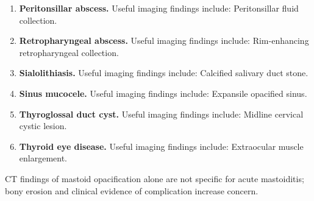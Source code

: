 \begin{enumerate}[leftmargin=*,itemsep=0.45em,topsep=0.4em]
\item \textbf{Peritonsillar abscess.} Useful imaging findings include: Peritonsillar fluid collection.
\item \textbf{Retropharyngeal abscess.} Useful imaging findings include: Rim-enhancing retropharyngeal collection.
\item \textbf{Sialolithiasis.} Useful imaging findings include: Calcified salivary duct stone.
\item \textbf{Sinus mucocele.} Useful imaging findings include: Expansile opacified sinus.
\item \textbf{Thyroglossal duct cyst.} Useful imaging findings include: Midline cervical cystic lesion.
\item \textbf{Thyroid eye disease.} Useful imaging findings include: Extraocular muscle enlargement.
\end{enumerate}

CT findings of mastoid opacification alone are not specific for acute mastoiditis; bony erosion and clinical evidence of complication increase concern.

